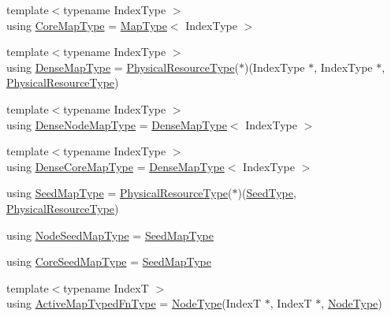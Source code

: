 \begin{DoxyCompactItemize}
\item 
{\footnotesize template$<$typename Index\+Type $>$ }\\using \hyperlink{namespacevt_1_1mapping_abff207bec72f006a2e66ff14fc51255a}{Core\+Map\+Type} = \hyperlink{namespacevt_1_1mapping_a443f8bb8920af5ae1d3391f61fe492a6}{Map\+Type}$<$ Index\+Type $>$
\item 
{\footnotesize template$<$typename Index\+Type $>$ }\\using \hyperlink{namespacevt_1_1mapping_a64f0fc107b569bb6644f1b015c6e7ad8}{Dense\+Map\+Type} = \hyperlink{namespacevt_a2dc36fcada816dc6d11774d650328ee9}{Physical\+Resource\+Type}($\ast$)(Index\+Type $\ast$, Index\+Type $\ast$, \hyperlink{namespacevt_a2dc36fcada816dc6d11774d650328ee9}{Physical\+Resource\+Type})
\item 
{\footnotesize template$<$typename Index\+Type $>$ }\\using \hyperlink{namespacevt_1_1mapping_a224f382367a2c65c3be2a9f91f89ffd5}{Dense\+Node\+Map\+Type} = \hyperlink{namespacevt_1_1mapping_a64f0fc107b569bb6644f1b015c6e7ad8}{Dense\+Map\+Type}$<$ Index\+Type $>$
\item 
{\footnotesize template$<$typename Index\+Type $>$ }\\using \hyperlink{namespacevt_1_1mapping_ac198c707792d29c7e3106fb89c3f3f92}{Dense\+Core\+Map\+Type} = \hyperlink{namespacevt_1_1mapping_a64f0fc107b569bb6644f1b015c6e7ad8}{Dense\+Map\+Type}$<$ Index\+Type $>$
\item 
using \hyperlink{namespacevt_1_1mapping_a1c1409d9af8d1ac402af022a65be4a4d}{Seed\+Map\+Type} = \hyperlink{namespacevt_a2dc36fcada816dc6d11774d650328ee9}{Physical\+Resource\+Type}($\ast$)(\hyperlink{namespacevt_ae2e13198bdef4d5b8e603d6c1c7f0969}{Seed\+Type}, \hyperlink{namespacevt_a2dc36fcada816dc6d11774d650328ee9}{Physical\+Resource\+Type})
\item 
using \hyperlink{namespacevt_1_1mapping_a84d654b657f2dbe639ada06ae688e4c7}{Node\+Seed\+Map\+Type} = \hyperlink{namespacevt_1_1mapping_a1c1409d9af8d1ac402af022a65be4a4d}{Seed\+Map\+Type}
\item 
using \hyperlink{namespacevt_1_1mapping_a963a37316992c8805e9a381a07380de0}{Core\+Seed\+Map\+Type} = \hyperlink{namespacevt_1_1mapping_a1c1409d9af8d1ac402af022a65be4a4d}{Seed\+Map\+Type}
\item 
{\footnotesize template$<$typename IndexT $>$ }\\using \hyperlink{namespacevt_1_1mapping_ad7c0812428b339edd904a865e0080ecd}{Active\+Map\+Typed\+Fn\+Type} = \hyperlink{namespacevt_a866da9d0efc19c0a1ce79e9e492f47e2}{Node\+Type}(IndexT $\ast$, IndexT $\ast$, \hyperlink{namespacevt_a866da9d0efc19c0a1ce79e9e492f47e2}{Node\+Type})

\end{DoxyCompactItemize}
